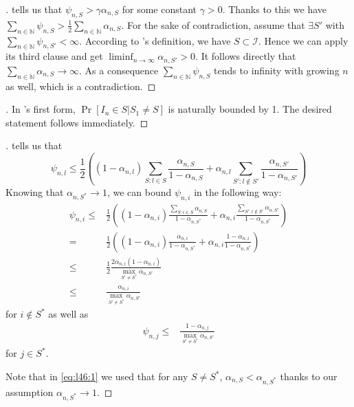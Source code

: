 \begin{proof}[]
   tells us that $\psi_{n, S} > \gamma
  \alpha_{n, S}$ for some constant $\gamma > 0$. Thanks to this we have $\sum_{n
  \in \mathbb{N}} \psi_{n, S} > \frac{1}{2} \sum_{n \in \mathbb{N}} \alpha_{n,
  S}$. For the sake of contradiction, assume that $\exists S'$ with $\sum_{n \in
  \mathbb{N}} \psi_{n, S'} < \infty$. According to
  's definition, we have $S \subset \mathcal{I}$.
  Hence we can apply its third clause and get $\liminf_{n \rightarrow \infty}
  \alpha_{n, S'} > 0$. It follows directly that $\sum_{n \in \mathbb{N}}
  \alpha_{n, S} \rightarrow \infty$. As a consequence $\sum_{n \in \mathbb{N}}
  \psi_{n, S}$ tends to infinity with growing $n$ as well, which is a
  contradiction.
\end{proof}

\begin{proof}[]
  In 's first form,  $\Pr[I_n \in S | S_1
  \neq S]$ is naturally bounded by 1. The desired statement follows immediately.
\end{proof}

\begin{proof}[]
   tells us that
  \[\psi_{n, l} \leq \frac{1}{2}((1 - \alpha_{n, l}) \sum_{S: l \in S}
      \frac{\alpha_{n, S}}{1 - \alpha_{n, S}} + \alpha_{n, l}
      \sum_{S': l \notin S'} \frac{\alpha_{n, S'}}{1 - \alpha_{n, S'}})\]
  Knowing that $\alpha_{n, S^*} \rightarrow 1$, we can bound $\psi_{n, i}$ in
  the following way:
  \begin{align}
    \psi_{n, i} \leq& \frac{1}{2}((1 - \alpha_{n, i}) \frac{\sum_{S: i \in S}
        \alpha_{n, S}}{1 - \alpha_{n, S^*}} + \alpha_{n, i} \frac{\sum_{S': i
        \notin S'} \alpha_{n, S'}}{1 - \alpha_{n, S^*}}) \label{eq:l46:1}\\
      =& \frac{1}{2}((1 - \alpha_{n, i}) \frac{\alpha_{n, i}}{1 - \alpha_{n,
          S^*}} + \alpha_{n, i} \frac{1 - \alpha_{n, i}}{1 - \alpha_{n, S^*}})\\
      \leq& \frac{1}{2} \frac{2 \alpha_{n, i} (1 - \alpha_{n, i})}{\max_{S'
          \neq S^*} \alpha_{n, S'}} \\
      \leq& \frac{\alpha_{n, i}}{\max_{S' \neq S^*} \alpha_{n, S'}}
  \end{align}
  for $i \notin S^*$ as well as
  \begin{align}
    \psi_{n, j} \leq& \frac{1 - \alpha_{n, j}}{\max_{S' \neq S^*} \alpha_{n,
        S'}}
  \end{align}
  for $j \in S^*$.

  Note that in \eqref{eq:l46:1} we used that for any $S \neq S^*$, $\alpha_{n,
  S} < \alpha_{n, S^*}$ thanks to our assumption $\alpha_{n, S^*} \rightarrow
  1$.
\end{proof}

